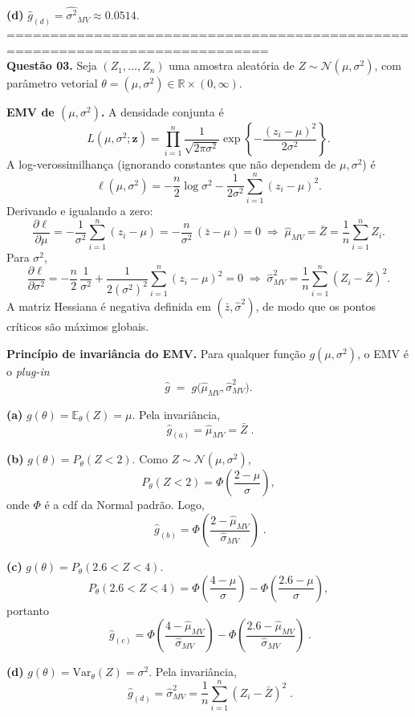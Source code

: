 \noindent
\textbf{(d)} $\widehat g_{(d)}=\widehat{\sigma^2}_{MV}\approx 0.0514$.
============================================================================ \\
\textbf{Questão 03.} Seja $(Z_1,\ldots,Z_n)$ uma amostra aleatória de
$Z\sim\mathcal N(\mu,\sigma^2)$, com parâmetro vetorial
$\theta=(\mu,\sigma^2)\in\mathbb R\times(0,\infty)$.

\medskip
\textbf{EMV de $(\mu,\sigma^2)$.}
A densidade conjunta é
\[
L(\mu,\sigma^2;\mathbf z)=
\prod_{i=1}^n \frac{1}{\sqrt{2\pi\sigma^2}}
\exp\!\left\{-\frac{(z_i-\mu)^2}{2\sigma^2}\right\}.
\]
A log-verossimilhança (ignorando constantes que não dependem de $\mu,\sigma^2$) é
\[
\ell(\mu,\sigma^2)
= -\frac{n}{2}\log\sigma^2
  -\frac{1}{2\sigma^2}\sum_{i=1}^n (z_i-\mu)^2 .
\]
Derivando e igualando a zero:
\[
\frac{\partial \ell}{\partial \mu}
= -\frac{1}{\sigma^2}\sum_{i=1}^n (z_i-\mu)
= -\frac{n}{\sigma^2}\,(\bar z-\mu)=0
\;\Longrightarrow\;
\widehat\mu_{MV}=\bar Z=\frac{1}{n}\sum_{i=1}^n Z_i.
\]
Para $\sigma^2$,
\[
\frac{\partial \ell}{\partial \sigma^2}
= -\frac{n}{2}\,\frac{1}{\sigma^2}
  +\frac{1}{2(\sigma^2)^2}\sum_{i=1}^n (z_i-\mu)^2
  =0
\;\Longrightarrow\;
\widehat\sigma^2_{MV}
=\frac{1}{n}\sum_{i=1}^n (Z_i-\bar Z)^2.
\]
A matriz Hessiana é negativa definida em $(\bar z,\widehat\sigma^2)$, de modo que os pontos críticos são máximos globais.

\medskip
\textbf{Princípio de invariância do EMV.}
Para qualquer função $g(\mu,\sigma^2)$, o EMV é o \emph{plug-in}
\[
\widehat g \;=\; g\big(\widehat\mu_{MV},\widehat\sigma^2_{MV}\big).
\]

\bigskip
\textbf{(a) } $g(\theta)=\mathbb E_\theta(Z)=\mu$.
Pela invariância,
\[
\boxed{\;\widehat g_{(a)}=\widehat\mu_{MV}=\bar Z\; }.
\]

\bigskip
\textbf{(b) } $g(\theta)=P_\theta(Z<2)$.
Como $Z\sim\mathcal N(\mu,\sigma^2)$,
\[
P_\theta(Z<2)=\Phi\!\left(\frac{2-\mu}{\sigma}\right),
\]
onde $\Phi$ é a cdf da Normal padrão. Logo,
\[
\boxed{\;\widehat g_{(b)}
=\Phi\!\left(\dfrac{2-\widehat\mu_{MV}}{\widehat\sigma_{MV}}\right)\; }.
\]

\bigskip
\textbf{(c) } $g(\theta)=P_\theta(2.6<Z<4)$.
\[
P_\theta(2.6<Z<4)=
\Phi\!\left(\frac{4-\mu}{\sigma}\right)-
\Phi\!\left(\frac{2.6-\mu}{\sigma}\right),
\]
portanto
\[
\boxed{\;\widehat g_{(c)}
=\Phi\!\left(\dfrac{4-\widehat\mu_{MV}}{\widehat\sigma_{MV}}\right)-
 \Phi\!\left(\dfrac{2.6-\widehat\mu_{MV}}{\widehat\sigma_{MV}}\right)\; }.
\]

\bigskip
\textbf{(d) } $g(\theta)=\mathrm{Var}_\theta(Z)=\sigma^2$.
Pela invariância,
\[
\boxed{\;\widehat g_{(d)}=\widehat\sigma^2_{MV}
=\dfrac{1}{n}\sum_{i=1}^n (Z_i-\bar Z)^2\; }.
\]

